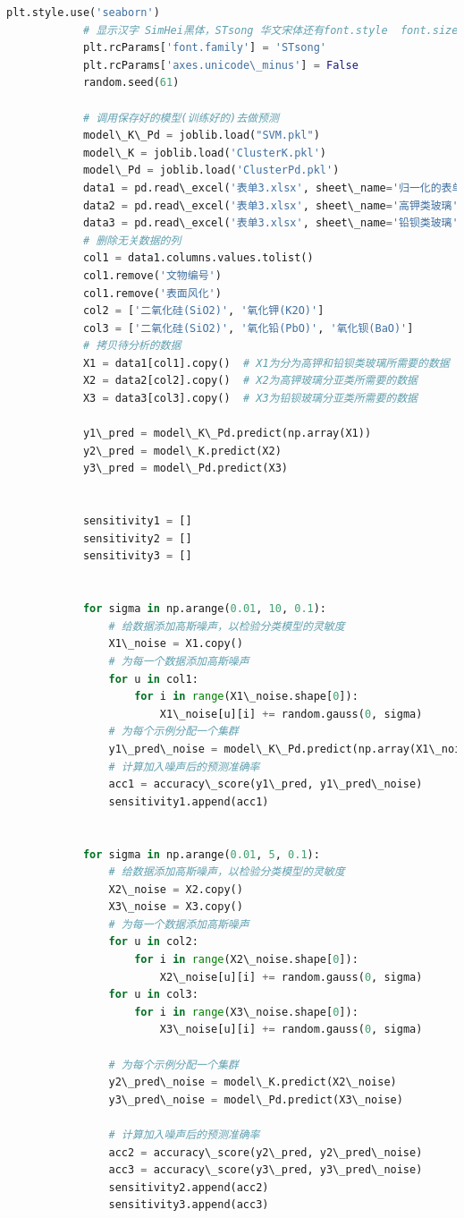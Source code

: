 \documentclass[withoutpreface,bwprint]{cumcmthesis}
\begin{document}
\begin{appendices}
\begin{lstlisting}[language=Python]
			plt.style.use('seaborn')
			# 显示汉字 SimHei黑体，STsong 华文宋体还有font.style  font.size等
			plt.rcParams['font.family'] = 'STsong'
			plt.rcParams['axes.unicode\_minus'] = False
			random.seed(61)
			
			# 调用保存好的模型(训练好的)去做预测
			model\_K\_Pd = joblib.load("SVM.pkl")
			model\_K = joblib.load('ClusterK.pkl')
			model\_Pd = joblib.load('ClusterPd.pkl')
			data1 = pd.read\_excel('表单3.xlsx', sheet\_name='归一化的表单3')
			data2 = pd.read\_excel('表单3.xlsx', sheet\_name='高钾类玻璃')
			data3 = pd.read\_excel('表单3.xlsx', sheet\_name='铅钡类玻璃')
			# 删除无关数据的列
			col1 = data1.columns.values.tolist()
			col1.remove('文物编号')
			col1.remove('表面风化')
			col2 = ['二氧化硅(SiO2)', '氧化钾(K2O)']
			col3 = ['二氧化硅(SiO2)', '氧化铅(PbO)', '氧化钡(BaO)']
			# 拷贝待分析的数据
			X1 = data1[col1].copy()  # X1为分为高钾和铅钡类玻璃所需要的数据
			X2 = data2[col2].copy()  # X2为高钾玻璃分亚类所需要的数据
			X3 = data3[col3].copy()  # X3为铅钡玻璃分亚类所需要的数据
			
			y1\_pred = model\_K\_Pd.predict(np.array(X1))
			y2\_pred = model\_K.predict(X2)
			y3\_pred = model\_Pd.predict(X3)
			
			
			sensitivity1 = []
			sensitivity2 = []
			sensitivity3 = []
			
			
			for sigma in np.arange(0.01, 10, 0.1):
				# 给数据添加高斯噪声，以检验分类模型的灵敏度
				X1\_noise = X1.copy()
				# 为每一个数据添加高斯噪声
				for u in col1:
					for i in range(X1\_noise.shape[0]):
						X1\_noise[u][i] += random.gauss(0, sigma)
				# 为每个示例分配一个集群
				y1\_pred\_noise = model\_K\_Pd.predict(np.array(X1\_noise))
				# 计算加入噪声后的预测准确率
				acc1 = accuracy\_score(y1\_pred, y1\_pred\_noise)
				sensitivity1.append(acc1)
			
			
			for sigma in np.arange(0.01, 5, 0.1):
				# 给数据添加高斯噪声，以检验分类模型的灵敏度
				X2\_noise = X2.copy()
				X3\_noise = X3.copy()
				# 为每一个数据添加高斯噪声
				for u in col2:
					for i in range(X2\_noise.shape[0]):
						X2\_noise[u][i] += random.gauss(0, sigma)
				for u in col3:
					for i in range(X3\_noise.shape[0]):
						X3\_noise[u][i] += random.gauss(0, sigma)
			
				# 为每个示例分配一个集群
				y2\_pred\_noise = model\_K.predict(X2\_noise)
				y3\_pred\_noise = model\_Pd.predict(X3\_noise)
			
				# 计算加入噪声后的预测准确率
				acc2 = accuracy\_score(y2\_pred, y2\_pred\_noise)
				acc3 = accuracy\_score(y3\_pred, y3\_pred\_noise)
				sensitivity2.append(acc2)
				sensitivity3.append(acc3)
			

\end{lstlisting}
\end{appendices}
\end{document}
